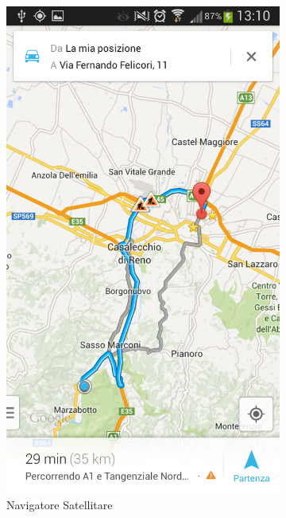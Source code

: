 \begin{figure}
\begin{subfigure}{0.45\textwidth}
		\includegraphics[width=\textwidth]{assets/mobile-app-navigator.png}
		\caption{Navigatore Satellitare}
		\label{fig:navigator}
    \end{subfigure}
	\begin{subfigure}{0.45\textwidth}

\end{subfigure}
\end{figure}
